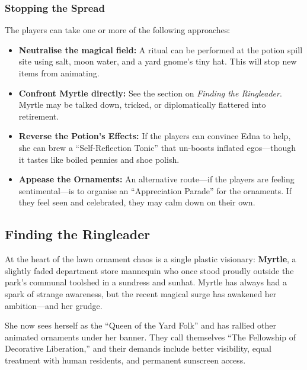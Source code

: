 \subsubsection{Stopping the Spread}
The players can take one or more of the following approaches:
\begin{itemize}
    \item \textbf{Neutralise the magical field:} A ritual can be performed at the potion spill site using salt, moon water, and a yard gnome’s tiny hat. This will stop new items from animating.
    \item \textbf{Confront Myrtle directly:} See the section on \emph{Finding the Ringleader}. Myrtle may be talked down, tricked, or diplomatically flattered into retirement.
    \item \textbf{Reverse the Potion’s Effects:} If the players can convince Edna to help, she can brew a “Self-Reflection Tonic” that un-boosts inflated egos—though it tastes like boiled pennies and shoe polish.
    \item \textbf{Appease the Ornaments:} An alternative route—if the players are feeling sentimental—is to organise an “Appreciation Parade” for the ornaments. If they feel seen and celebrated, they may calm down on their own.
\end{itemize}


\subsection{Finding the Ringleader}

At the heart of the lawn ornament chaos is a single plastic visionary: \textbf{Myrtle}, a slightly faded department store mannequin who once stood proudly outside the park’s communal toolshed in a sundress and sunhat. Myrtle has always had a spark of strange awareness, but the recent magical surge has awakened her ambition—and her grudge.

She now sees herself as the “Queen of the Yard Folk” and has rallied other animated ornaments under her banner. They call themselves “The Fellowship of Decorative Liberation,” and their demands include better visibility, equal treatment with human residents, and permanent sunscreen access.

